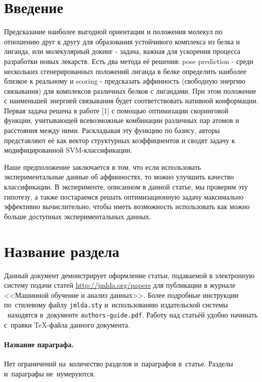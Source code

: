 \documentclass[12pt,twoside]{article}
\title
    {Формулировка и решение задачи оптимизации, сочетающей классификацию и регрессию, 
    для оценки энергии связывания белка и маленьких молекул}
\author
    {Грачева~А.\,С., Соавтор~И.\,О., Фамилия~И.\,О.} %
\begin{document}
\maketitle
\section{Введение}
Предсказание наиболее выгодной ориентации и положения молекул по отношению друг к другу для образования устойчивого комплекса из белка и лиганда, или молекулярный докинг - задача, важная для ускорения процесса разработки новых лекарств.
Есть два метода её решения: pose prediction - среди нескольких сгенерированных положений лиганда в белке определить наиболее близкое к реальному и scoring - предсказать аффинность (свободную энергию связывания) для комплексов различных белков с лигандами. При этом положение с наименьшей энергией связывания будет соответствовать нативной конформации. Первая задача решена в работе [1] с помощью оптимизации скоринговой функции, учитывающей всевозможные комбинации различных пар атомов и расстояния между ними. Раскладывая эту функцию по базису, авторы представляют её как вектор структурных коэффициентов и сводят задачу к модифицированной SVM-классификации.

Наше предположение заключается в том, что если использовать экспериментальные данные об аффинностях, то можно улучшить качество классификации. В эксперименте, описанном в данной статье, мы проверим эту гипотезу, а также постараемся решать оптимизационную задачу максимально эффективно вычислительно, чтобы иметь возможность использовать как можно больше доступных экспериментальных  данных.

\section{Название раздела}
Данный документ демонстрирует оформление статьи,
подаваемой в электронную систему подачи статей \url{http://jmlda.org/papers} для публикации в журнале <<Машинной обучение и анализ данных>>.
Более подробные инструкции по~стилевому файлу \texttt{jmlda.sty}
и~использованию издательской системы \LaTeXe\
находятся в~документе \texttt{authors-guide.pdf}.
Работу над статьёй удобно начинать с~правки \TeX-файла данного документа.

\paragraph{Название параграфа.}
Нет ограничений на~количество разделов и~параграфов в~статье.
Разделы и~параграфы не~нумеруются.
\end{document}
